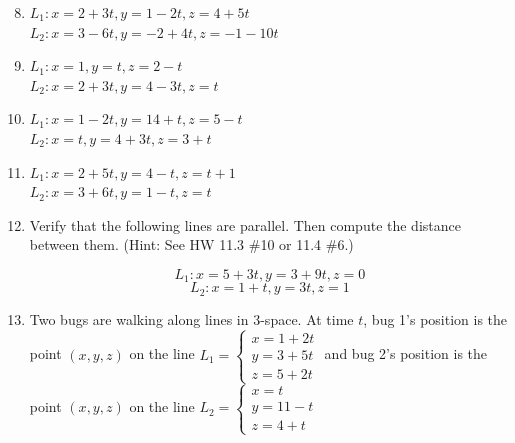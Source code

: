 \documentclass[12pt]{article}
\newif\ifans
\begin{document}
\begin{enumerate}
\setcounter{enumi}{7}

\item $L_1: x=2+3t, y=1-2t, z=4+5t$\\
$L_2: x=3-6t, y=-2+4t, z=-1-10t$

\ifans{\fbox{The lines are parallel.}} \fi

\item $L_1: x=1, y=t, z=2-t$\\
$L_2: x=2+3t, y=4-3t, z=t$

\ifans{\fbox{The lines are skew.}} \fi

\item $L_1: x=1-2t, y=14+t, z=5-t$\\
$L_2: x=t, y=4+3t, z=3+t$

\ifans{\fbox{The lines intersect at the point $(x,y,z)=(3,13,6)$; Detailed Solution: \textcolor{blue}{\href{http://www.math.drexel.edu/classes/Calculus/resources/Math200HW/Solutions/05_200_Lines_10.pdf}{Here}}}} \fi

\item $L_1: x=2+5t, y=4-t, z=t+1$\\
$L_2: x=3+6t, y=1-t, z=t$

\ifans{\fbox{The lines are skew.}} \fi

\item Verify that the following lines are parallel.  Then compute the distance between them. (Hint: See HW 11.3 \#10 or 11.4 \#6.)

$$L_1: x=5+3t, y=3+9t, z=0$$
$$L_2: x=1+t, y=3t, z=1$$

\ifans{\fbox{\parbox{1\linewidth}{The lines are parallel because $\langle 3,9,0\rangle=3\langle1,3,0\rangle$.  The distance between the lines is $d=\sqrt{\frac{91}{10}}$}}} \fi

\item Two bugs are walking along lines in 3-space.  At time $t$, bug 1's position is the point $(x,y,z)$ on the line $L_1=\left\{\begin{array}{l}
x=1+2t\\
y=3+5t\\
z=5+2t\end{array}\right.$ and bug 2's position is the point $(x,y,z)$ on the line $L_2=\left\{\begin{array}{l}
x=t\\
y=11-t\\
z=4+t\end{array}\right.$


\end{enumerate}
\end{document}

